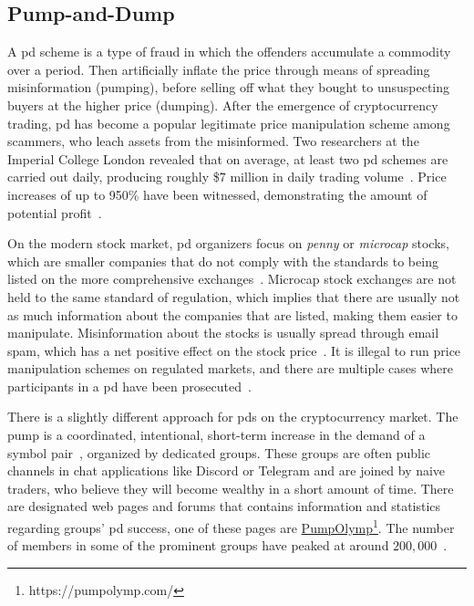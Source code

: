 

\subsection{Pump-and-Dump}\label{sec:pd}
A \ac{pd} scheme is a type of fraud in which the offenders accumulate a commodity over a period. Then artificially inflate the price through means of spreading misinformation (pumping), before selling off what they bought to unsuspecting buyers at the higher price (dumping)\cite{P&D_to_the_moon}. After the emergence of cryptocurrency trading, \ac{pd} has become a popular legitimate price manipulation scheme among scammers, who leach assets from the misinformed. Two researchers at the Imperial College London revealed that on average, at least two \ac{pd} schemes are carried out daily, producing roughly \$$7$ million in daily trading volume~\cite{P&D_MIT_crypto}. Price increases of up to 950\% have been witnessed, demonstrating the amount of potential profit~\cite{P&D_cointelegraph}.

On the modern stock market, \ac{pd} organizers focus on \emph{penny} or \emph{microcap} stocks, which are smaller companies that do not comply with the standards to being listed on the more comprehensive exchanges~\cite{stock_bouraoui, stock_temple, P&D_anatomy}. Microcap stock exchanges are not held to the same standard of regulation, which implies that there are usually not as much information about the companies that are listed, making them easier to manipulate. Misinformation about the stocks is usually spread through email spam, which has a net positive effect on the stock price~\cite{stock_bouraoui}. It is illegal to run price manipulation schemes on regulated markets, and there are multiple cases where participants in a \ac{pd} have been prosecuted~\cite{P&D_to_the_moon}.

There is a slightly different approach for \acp{pd} on the cryptocurrency market. The pump is a coordinated, intentional, short-term increase in the demand of a symbol pair~\cite{P&D_anatomy}, organized by dedicated groups. These groups are often public channels in chat applications like Discord or Telegram and are joined by naive traders, who believe they will become wealthy in a short amount of time. There are designated web pages and forums that contains information and statistics regarding groups' \ac{pd} success, one of these pages are \href{https://pumpolymp.com/}{PumpOlymp}\footnote{https://pumpolymp.com/}. The number of members in some of the prominent groups have peaked at around $200,000$~\cite{P&D_the_outline}.

